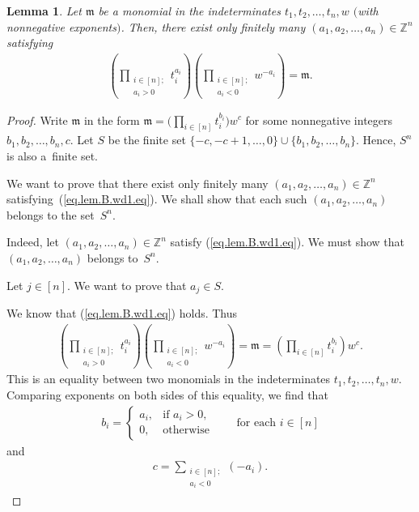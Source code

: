 \documentclass[pdftex]{sigma}
\newtheorem{Lemma}[Theorem]{Lemma}
\numberwithin{equation}{section}
\let\sumnonlimits\sum
\let\prodnonlimits\prod
\renewcommand{\sum}{\sumnonlimits\limits}
\renewcommand{\prod}{\prodnonlimits\limits}
\begin{document}
\begin{Lemma}\label{lem.B.wd1}Let $\mathfrak{m}$ be a monomial in the indeterminates $t_{1},t_{2},\ldots,t_{n},w$ $($with nonnegative exponents$)$. Then, there exist only finitely many $( a_{1},a_{2},\ldots,a_{n}) \in\mathbb{Z}^{n}$ satisfying
\begin{gather}
\left( \prod_{\substack{i\in[n] ;\\a_{i}>0}}t_{i}^{a_{i}}\right) \left( \prod_{\substack{i\in[n] ;\\a_{i}<0}}w^{-a_{i}}\right) =\mathfrak{m}. \label{eq.lem.B.wd1.eq}
\end{gather}
\end{Lemma}

\begin{proof} Write $\mathfrak{m}$ in the form $\mathfrak{m}=\Big( \prod_{i\in[n] }t_{i}^{b_{i}}\Big) w^{c}$ for some nonnegative integers $b_{1},b_{2},\ldots,b_{n},c$. Let $S$ be the finite set $ \{ -c,-c+1,\ldots,0 \} \cup \{ b_{1} ,b_{2},\ldots,b_{n} \} $. Hence, $S^{n}$ is also a~finite set.

We want to prove that there exist only finitely many $ ( a_{1},a_{2},\ldots,a_{n} ) \in\mathbb{Z}^{n}$ satisfying~(\ref{eq.lem.B.wd1.eq}). We shall show that each such $ ( a_{1},a_{2},\ldots,a_{n} ) $ belongs to the set~$S^{n}$.

Indeed, let $ ( a_{1},a_{2},\ldots,a_{n} ) \in\mathbb{Z}^{n}$ satisfy (\ref{eq.lem.B.wd1.eq}). We must show that $ ( a_{1},a_{2},\ldots,a_{n} ) $ belongs to~$S^{n}$.

Let $j\in[n] $. We want to prove that $a_{j}\in S$.

We know that (\ref{eq.lem.B.wd1.eq}) holds. Thus
\begin{gather*}
\left( \prod_{\substack{i\in[n] ;\\a_{i}>0}}t_{i}^{a_{i}}\right) \left( \prod_{\substack{i\in[n] ;\\a_{i}<0}}w^{-a_{i}}\right) =\mathfrak{m}=\left( \prod_{i\in[n] }t_{i}^{b_{i}}\right) w^{c}.
\end{gather*}
This is an equality between two monomials in the indeterminates $t_{1},t_{2},\ldots,t_{n},w$. Comparing exponents on both sides of this equality, we find that
\begin{gather}
b_{i}=
\begin{cases}
a_{i}, & \text{if }a_{i}>0,\\
0, & \text{otherwise}
\end{cases}
\qquad \text{for each }i\in[n] \label{pf.lem.B.wd1.bi=}
\end{gather}
and
\begin{gather}
c=\sum_{\substack{i\in[n] ;\\a_{i}<0}} ( -a_{i} ) .\label{pf.lem.B.wd1.c=}
\end{gather}


\end{proof}
\end{document}

